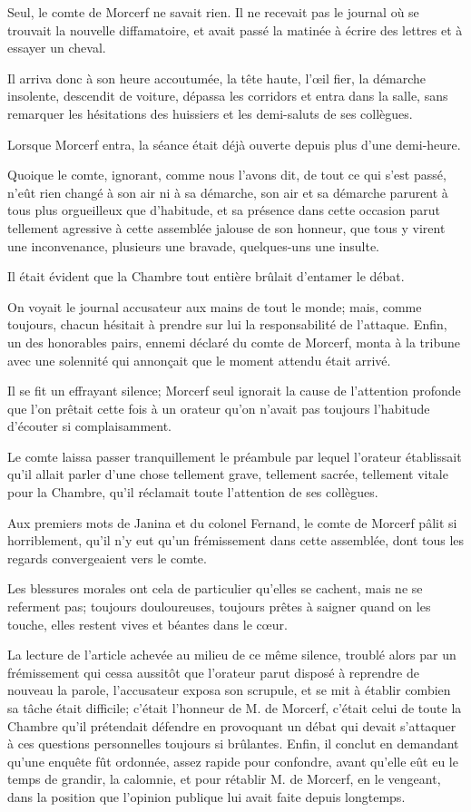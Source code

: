 Seul, le comte de Morcerf ne savait rien. Il ne recevait pas le journal où se trouvait la nouvelle diffamatoire, et avait passé la matinée à écrire des lettres et à essayer un cheval. 

Il arriva donc à son heure accoutumée, la tête haute, l'œil fier, la démarche insolente, descendit de voiture, dépassa les corridors et entra dans la salle, sans remarquer les hésitations des huissiers et les demi-saluts de ses collègues. 

Lorsque Morcerf entra, la séance était déjà ouverte depuis plus d'une demi-heure. 

Quoique le comte, ignorant, comme nous l'avons dit, de tout ce qui s'est passé, n'eût rien changé à son air ni à sa démarche, son air et sa démarche parurent à tous plus orgueilleux que d'habitude, et sa présence dans cette occasion parut tellement agressive à cette assemblée jalouse de son honneur, que tous y virent une inconvenance, plusieurs une bravade, quelques-uns une insulte. 

Il était évident que la Chambre tout entière brûlait d'entamer le débat. 

On voyait le journal accusateur aux mains de tout le monde; mais, comme toujours, chacun hésitait à prendre sur lui la responsabilité de l'attaque. Enfin, un des honorables pairs, ennemi déclaré du comte de Morcerf, monta à la tribune avec une solennité qui annonçait que le moment attendu était arrivé. 

Il se fit un effrayant silence; Morcerf seul ignorait la cause de l'attention profonde que l'on prêtait cette fois à un orateur qu'on n'avait pas toujours l'habitude d'écouter si complaisamment. 

Le comte laissa passer tranquillement le préambule par lequel l'orateur établissait qu'il allait parler d'une chose tellement grave, tellement sacrée, tellement vitale pour la Chambre, qu'il réclamait toute l'attention de ses collègues. 

Aux premiers mots de Janina et du colonel Fernand, le comte de Morcerf pâlit si horriblement, qu'il n'y eut qu'un frémissement dans cette assemblée, dont tous les regards convergeaient vers le comte. 

Les blessures morales ont cela de particulier qu'elles se cachent, mais ne se referment pas; toujours douloureuses, toujours prêtes à saigner quand on les touche, elles restent vives et béantes dans le cœur. 

La lecture de l'article achevée au milieu de ce même silence, troublé alors par un frémissement qui cessa aussitôt que l'orateur parut disposé à reprendre de nouveau la parole, l'accusateur exposa son scrupule, et se mit à établir combien sa tâche était difficile; c'était l'honneur de M. de Morcerf, c'était celui de toute la Chambre qu'il prétendait défendre en provoquant un débat qui devait s'attaquer à ces questions personnelles toujours si brûlantes. Enfin, il conclut en demandant qu'une enquête fût ordonnée, assez rapide pour confondre, avant qu'elle eût eu le temps de grandir, la calomnie, et pour rétablir M. de Morcerf, en le vengeant, dans la position que l'opinion publique lui avait faite depuis longtemps. 

